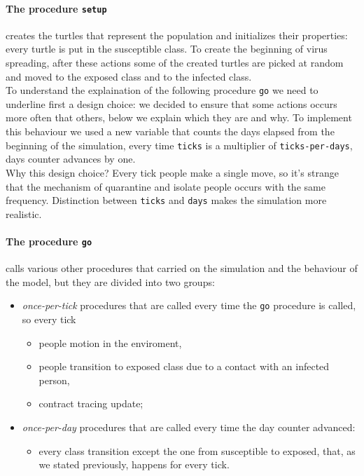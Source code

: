\documentclass[12pt]{llncs}
\begin{document}
\paragraph{The procedure \texttt{setup}} creates the turtles that represent the population and initializes their properties: every turtle is put in the susceptible class. To create the beginning of virus spreading, after these actions some of the created turtles are picked at random and moved to the exposed class and to the infected class.\\

To understand the explaination of the following procedure \texttt{go} we need to underline first a design choice: we decided to ensure that some actions occurs more often that others, below we explain which they are and why. To implement this behaviour we used a new variable that counts the days elapsed from the beginning of the simulation, every time \texttt{ticks} is a multiplier of \texttt{ticks-per-days}, days counter advances by one.\\
Why this design choice? Every tick people make a single move, so it's strange that the mechanism of quarantine and isolate people occurs with the same frequency. Distinction between \texttt{ticks} and \texttt{days} makes the simulation more realistic.

\paragraph{The procedure \texttt{go}} calls various other procedures that carried on the simulation and the behaviour of the model, but they are divided into two groups:
\begin{itemize}
\item \textit{once-per-tick} procedures that are called every time the \texttt{go} procedure is called, so every tick
\begin{itemize}
\item people motion in the enviroment, 
\item people transition to exposed class due to a contact with an infected person,
\item contract tracing update;
\end{itemize}
\item \textit{once-per-day} procedures that are called every time the day counter advanced:
\begin{itemize}
\item every class transition except the one from susceptible to exposed, that, as we stated previously, happens for every tick.
\end{itemize}
\end{itemize}
\end{document}
